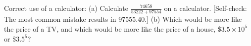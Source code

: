  Correct use of a calculator: (a) Calculate $\frac{74658}{53222+97554}$ on a calculator.
[Self-check: The most common mistake results in 97555.40.] \answercheck\hwendpart
(b) Which would be more like the price of a TV, and which
would be more like the price of a house, \$$3.5\times10^5$  or \$$3.5^5$?
